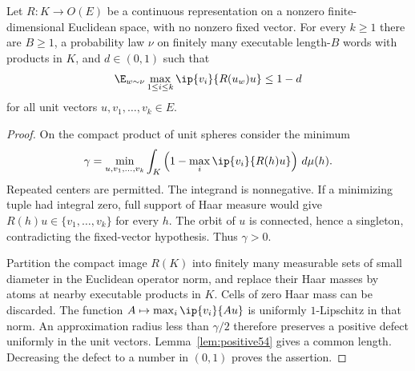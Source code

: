 \begin{lemma}\label{lem:gap54}
Let $R:K\to O(E)$ be a continuous representation on a nonzero finite-dimensional Euclidean space, with no nonzero fixed vector. For every $k\ge1$ there are $B\ge1$, a probability law $\nu$ on finitely many executable length-$B$ words with products in $K$, and $d\in(0,1)$ such that
\begin{equation}\label{eq:gap54}
 \E_{w\sim\nu}\max_{1\le i\le k}\ip{v_i}{R(u_w)u}\le1-d
\end{equation}
for all unit vectors $u,v_1,\ldots,v_k\in E$.
\end{lemma}
\begin{proof}
On the compact product of unit spheres consider the minimum
\[
 \gamma=\min_{u,v_1,\ldots,v_k}\int_K
 \left(1-\max_i\ip{v_i}{R(h)u}\right)\,d\mu(h).
\]
Repeated centers are permitted. The integrand is nonnegative. If a minimizing tuple had integral zero, full support of Haar measure would give $R(h)u\in\{v_1,\ldots,v_k\}$ for every $h$. The orbit of $u$ is connected, hence a singleton, contradicting the fixed-vector hypothesis. Thus $\gamma>0$.

Partition the compact image $R(K)$ into finitely many measurable sets of small diameter in the Euclidean operator norm, and replace their Haar masses by atoms at nearby executable products in $K$. Cells of zero Haar mass can be discarded. The function $A\mapsto\max_i\ip{v_i}{Au}$ is uniformly $1$-Lipschitz in that norm. An approximation radius less than $\gamma/2$ therefore preserves a positive defect uniformly in the unit vectors. Lemma~\ref{lem:positive54} gives a common length. Decreasing the defect to a number in $(0,1)$ proves the assertion.
\end{proof}

